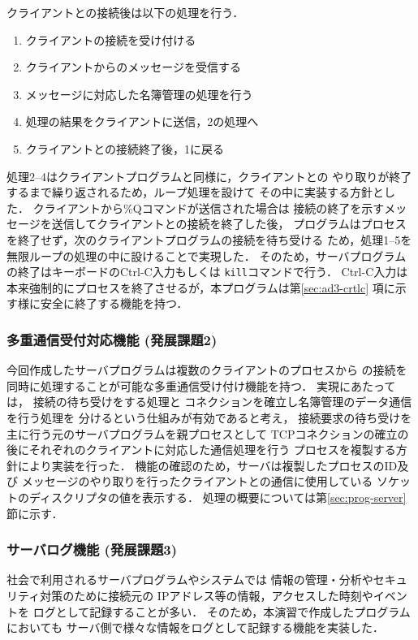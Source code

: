 クライアントとの接続後は以下の処理を行う．
\begin{enumerate}
  \item クライアントの接続を受け付ける
  \item クライアントからのメッセージを受信する
  \item メッセージに対応した名簿管理の処理を行う
  \item 処理の結果をクライアントに送信，2の処理へ
  \item クライアントとの接続終了後，1に戻る
\end{enumerate}
処理2--4はクライアントプログラムと同様に，クライアントとの
やり取りが終了するまで繰り返されるため，ループ処理を設けて
その中に実装する方針とした．
クライアントから\%Qコマンドが送信された場合は
接続の終了を示すメッセージを送信してクライアントとの接続を終了した後，
プログラムはプロセスを終了せず，次のクライアントプログラムの接続を待ち受ける
ため，処理1--5を無限ループの処理の中に設けることで実現した．
そのため，サーバプログラムの終了はキーボードのCtrl-C入力もしくは
\verb|kill|コマンドで行う．
Ctrl-C入力は本来強制的にプロセスを終了させるが，本プログラムは第\ref{sec:ad3-crtlc}
項に示す様に安全に終了する機能を持つ．


\subsubsection{多重通信受付対応機能 (発展課題2)} \label{sec:ad2-multi}
今回作成したサーバプログラムは複数のクライアントのプロセスから
の接続を同時に処理することが可能な多重通信受け付け機能を持つ．
実現にあたっては，
接続の待ち受けをする処理と
コネクションを確立し名簿管理のデータ通信を行う処理を
分けるという仕組みが有効であると考え，
接続要求の待ち受けを主に行う元のサーバプログラムを親プロセスとして
TCPコネクションの確立の後にそれぞれのクライアントに対応した通信処理を行う
プロセスを複製する方針により実装を行った．
機能の確認のため，サーバは複製したプロセスのID及び
メッセージのやり取りを行ったクライアントとの通信に使用している
ソケットのディスクリプタの値を表示する．
処理の概要については第\ref{sec:prog-server}節に示す．

\subsubsection{サーバログ機能 (発展課題3)} \label{sec:ad3-log}
社会で利用されるサーバプログラムやシステムでは
情報の管理・分析やセキュリティ対策のために接続元の
IPアドレス等の情報，アクセスした時刻やイベントを
ログとして記録することが多い．
そのため，本演習で作成したプログラムにおいても
サーバ側で様々な情報をログとして記録する機能を実装した．

